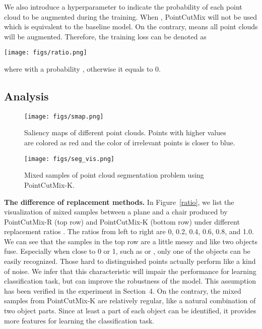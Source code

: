\documentclass{article}
\begin{document}
We also introduce a hyperparameter  to indicate the probability of each point cloud to be augmented during the training. When , PointCutMix will not be used which is equivalent to the baseline model. On the contrary,  means all point clouds will be augmented. Therefore, the training loss can be denoted as

\begin{figure*}[t]
\vskip 0.2in
\begin{center}
\centerline{\texttt{[image: figs/ratio.png]}}
\caption{The visualization of the mixed samples between a plane and a chair under different replacement ratio . The samples in the first and second row are generated by PointCutMix-R and PointCutMix-K respectively.}
\label{ratio}
\end{center}
 \vskip -0.2in
\end{figure*}



where  with a probability , otherwise it equals to 0. 

\subsection{Analysis}


\begin{figure}[t]
\vskip 0.2in
\begin{center}
\centerline{\texttt{[image: figs/smap.png]}}
\caption{Saliency maps of different point clouds. Points with higher values are colored as red and the color of irrelevant points is closer to blue.}
\label{cam_smap}
\end{center}
\vskip -0.2in
\end{figure}

\begin{figure}[t]
\vskip 0.2in
\begin{center}
\centerline{\texttt{[image: figs/seg\_vis.png]}}
\caption{Mixed samples of point cloud segmentation problem using PointCutMix-K.}
\label{seg}
\end{center}
\vskip -0.2in
\end{figure}

\textbf{The difference of replacement methods.} 
In Figure~\ref{ratio}, we list the visualization of mixed samples between a plane and a chair produced by PointCutMix-R (top row) and PointCutMix-K (bottom row) under different replacement ratios . The ratios from left to right are 0, 0.2, 0.4, 0.6, 0.8, and 1.0. 
We can see that the samples in the top row are a little messy and like two objects fuse. Especially when  close to 0 or 1, such as  or , only one of the objects can be easily recognized. Those hard to distinguished points actually perform like a kind of noise. We infer that this characteristic will impair the performance for learning classification task, but can improve the robustness of the model. This assumption has been verified in the experiment in Section~4.
On the contrary, the mixed samples from PointCutMix-K are relatively regular, like a natural combination of two object parts. Since at least a part of each object can be identified, it provides more features for learning the classification task.
\end{document}
